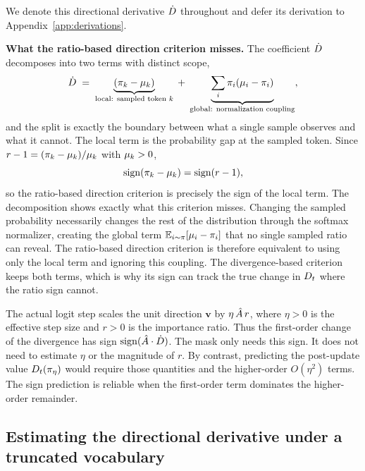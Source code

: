 We denote this directional derivative $\dot{D}$ throughout and defer its derivation to
Appendix~\ref{app:derivations}.

\noindent\textbf{What the ratio-based direction criterion misses.}
The coefficient $\dot{D}$ decomposes into two terms with distinct scope,
\begin{equation}
\label{eq:decomp}
\dot{D} \;=\; \underbrace{(\pi_k-\mu_k)}_{\text{local: sampled token } k}
\;+\; \underbrace{\sum_i \pi_i(\mu_i-\pi_i)}_{\text{global: normalization coupling}},
\end{equation}
and the split is exactly the boundary between what a single sample observes and what
it cannot. The local term is the probability gap at the sampled token. Since
$r-1=(\pi_k-\mu_k)/\mu_k$ with $\mu_k>0$,
\begin{equation}
\label{eq:local-is-ratio}
\operatorname{sign}(\pi_k-\mu_k)=\operatorname{sign}(r-1),
\end{equation}
so the ratio-based direction criterion is precisely the sign of the local term.
The decomposition shows exactly what this criterion misses.
Changing the sampled probability necessarily changes the rest of the distribution
through the softmax normalizer, creating the global term $\mathbb{E}_{i\sim\pi}[\mu_i-\pi_i]$ that no
single sampled ratio can reveal.
The ratio-based direction criterion is therefore equivalent to using only the
local term and ignoring this coupling.
The divergence-based criterion keeps both terms, which is why its sign can track
the true change in $D_t$ where the ratio sign cannot.

\begin{remark}
\label{rem:step-size}
The actual logit step scales the unit direction $\bm v$ by $\eta\,\hat{A}\,r$,
where $\eta>0$ is the effective step size and $r>0$ is the importance ratio.
Thus the first-order change of the divergence has sign
$\operatorname{sign}(\hat{A}\cdot\dot{D})$.
The mask only needs this sign.
It does not need to estimate $\eta$ or the magnitude of $r$.
By contrast, predicting the post-update value $D_t(\pi_\eta)$ would require
those quantities and the higher-order $O(\eta^2)$ terms.
The sign prediction is reliable when the first-order term dominates the
higher-order remainder.
\end{remark}

\subsection{Estimating the directional derivative under a truncated vocabulary}
\label{sec:method-estimators}

